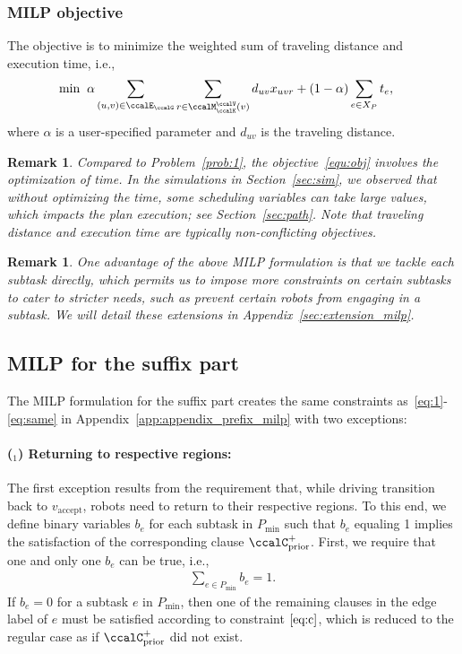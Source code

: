 \documentclass[Afour,sageh,times]{sagej}
\newtheorem{rem}[thm]{Remark}
\newcounter{mycounter}
\begin{document}
{{{{{\subsubsection{MILP objective} The objective is to minimize the weighted sum of traveling distance and execution time, i.e.,
\begingroup\makeatletter\def\f@size{10}\check@mathfonts
\def\maketag@@@#1{\hbox{\m@th\normalsize\normalfont#1}}%
\begin{align}\label{equ:obj}
  \min \; \;&  \alpha \sum_{(u,v)\in \ccalE_\ccalG}  \sum_{r \in \ccalM^\ccalV_{\ccalK}(v)} d_{uv} x_{uvr} +  (1 - \alpha) \sum_{e\in X_P} t_e,
\end{align}
 \endgroup
  where $\alpha$ is a user-specified parameter and  $d_{uv}$ is the traveling distance.
  \begin{rem}
   Compared to Problem~\ref{prob:1}, the objective~\eqref{equ:obj} involves the optimization of time. In the simulations in Section~\ref{sec:sim}, we observed that without optimizing the time, some scheduling variables can take large values, which impacts the plan execution; see Section~\ref{sec:path}. Note that traveling distance and execution time are typically non-conflicting objectives.
  \end{rem}
  \begin{rem}
    One advantage of the above MILP formulation is that we tackle each subtask directly,  which permits us to impose more constraints on certain subtasks to cater to stricter needs, such as prevent certain robots from engaging in a subtask. We will detail these extensions in Appendix~\ref{sec:extension_milp}.
  \end{rem}
                }}

\subsection{MILP for the suffix part}\label{app:appendix_suffix_milp}
                The MILP formulation for the suffix part creates the same  constraints as~\eqref{eq:1}-\eqref{eq:same} in Appendix~\ref{app:appendix_prefix_milp} with two exceptions:

\paragraph{($_1$) Returning to respective regions:} The first exception results from the requirement that, while driving transition back to $v_{\text{accept}}$, robots need to return to their respective regions.
To this end, we define binary variables $b_e$ for each subtask in $P_{\text{min}}$ such that $b_e$ equaling 1 implies the satisfaction of the corresponding clause $\ccalC_{\text{prior}}^+$. First, we require that one  and only one $b_e$ can be true, i.e.,
\begin{align}\label{eq:one_suffix}
  \sum_{e \in P_{\text{min}}} b_e = 1.
\end{align}
If $b_e=0$ for a subtask $e$ in $P_{\text{min}}$, then one of the remaining clauses in the edge label of $e$ must be satisfied according to constraint $\eqref{eq:c}$, which is reduced to the regular case as if  $\ccalC_{\text{prior}}^+$  did not exist.

}}}
\end{document}
